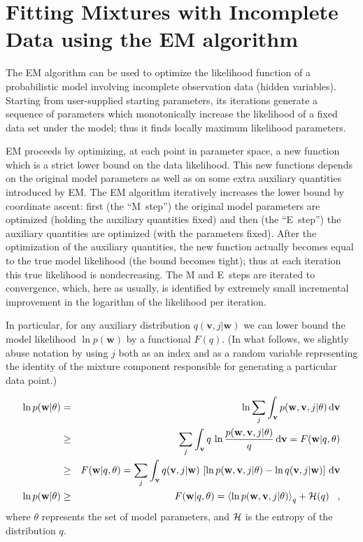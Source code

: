 \documentclass[12pt,preprint]{aastex}
\renewcommand{\vec}[1]{\mathbf{#1}} %
\newcommand{\vv}{\vec{v}}
\newcommand{\ww}{\vec{w}}
\begin{document}



\appendix
\section{Fitting Mixtures with Incomplete Data using
the EM algorithm}

The EM algorithm \citep{dempster77a} can be used to optimize the
likelihood function of a probabilistic model involving incomplete
observation data (hidden variables). Starting from user-supplied
starting parameters, its iterations generate a sequence of parameters
which monotonically increase the likelihood of a fixed data set under
the model; thus it finds locally maximum likelihood parameters.

EM proceeds by optimizing, at each point in parameter space, a new
function which is a strict lower bound on the data likelihood.  This
new functions depends on the original model parameters as well as on
some extra auxiliary quantities introduced by EM.  The EM algorithm
iteratively increases the lower bound by coordinate ascent: first (the
``M~step'') the original model parameters are optimized (holding the
auxiliary quantities fixed) and then (the ``E~step'') the auxiliary
quantities are optimized (with the parameters fixed). After the
optimization of the auxiliary quantities, the new function actually
becomes equal to the true model likelihood (the bound becomes tight);
thus at each iteration this true likelihood is nondecreasing.  The M
and E~steps are iterated to convergence, which, here as usually, is
identified by extremely small incremental improvement in the
logarithm of the likelihood per iteration.

In particular, for any auxiliary distribution $q(\vv,j|\ww)$ we can
lower bound the model likelihood $\ln p(\ww)$ by a functional
$F(q)$. (In what follows, we slightly abuse notation by using $j$ both
as an index and as a random variable representing the identity of the
mixture component responsible for generating a particular data point.)

\begin{eqnarray}\displaystyle
\ln p(\ww|\theta)
    &=& \ln \sum_j \int_{\vv} p(\ww,\vv,j|\theta)\,\mathrm{d}\vv\nonumber \\
 &\geq& \sum_j \int_{\vv} q\,\ln \frac{p(\ww,\vv,j|\theta)}{q}\,
                               \mathrm{d}\vv 
        = F(\ww|q,\theta)\nonumber \\
 &\geq& F(\ww|q,\theta)
        = \sum_j \int_{\vv} q(\vv,j|\ww)\,
          \left[ \ln p(\ww,\vv,j|\theta) - \ln q(\vv,j|\ww) \right]\,
          \mathrm{d}\vv\nonumber \\
\ln p(\ww|\theta)
 &\geq& F(\ww|q,\theta) = \left\langle \ln p(\ww,\vv,j|\theta)
                            \right\rangle_{q} + {\cal H}(q) \;\;\;,
\end{eqnarray}
where $\theta$ represents the set of model parameters, and ${\cal H}$
is the entropy of the distribution $q$.
\end{document}

